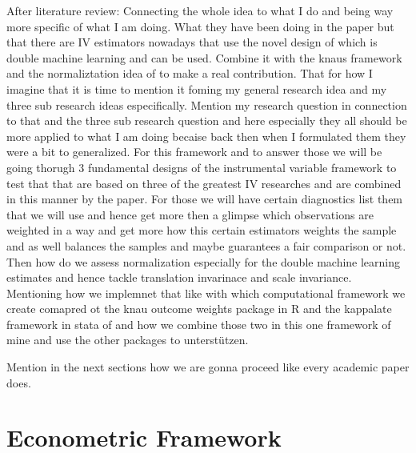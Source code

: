 \documentclass[12pt, a4paper, oneside]{article}
\theoremstyle{plain}
\theoremstyle{definition}
\begin{document}
After literature review: 
Connecting the whole idea to what I do and being way more specific of what I am doing. 
What they have been doing in the \citet{sloczynski2025abadie} paper but that there are IV estimators nowadays that use the novel design of \citet{chernozhukov2018double}
which is double machine learning and can be used. 
Combine it with the knaus framework and the normaliztation idea of to make a real contribution. That for how I imagine that it is time to mention it foming my general research idea and my three sub research ideas especifically. 
Mention my research question in connection to that and the three sub research question and here especially they all should be more applied to what I am doing becaise back then when I formulated them they were a bit to generalized. 
For this framework and to answer those we will be going thorugh 3 fundamental designs of the instrumental variable framework to test that that are based on three of the greatest IV researches and are combined in  this manner by the \cite{sloczynski2025abadie} paper.
For those we will have  certain diagnostics list them that we will use and hence get more then a glimpse which observations are weighted in a way and get more how this certain estimators weights the sample and as well balances the samples and maybe guarantees a fair comparison or not. 
Then how do we assess normalization especially for the double machine learning estimates and hence tackle translation invarinace and scale invariance. 
Mentioning how we implemnet that like with which computational framework we create comapred ot the knau outcome weights package in R and the kappalate framework in stata of \citet{sloczynski2025abadie} and how we combine those two in this one framework of mine and use the other packages to unterstützen.

Mention in the next sections how we are gonna proceed like every academic paper does. 





 


\section{Econometric Framework}
\end{document}
